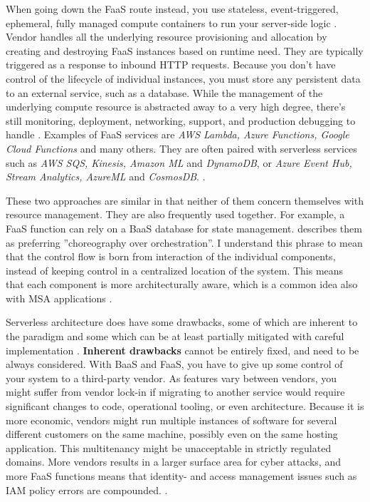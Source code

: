 \documentclass[utf8,english]{gradu3}
\begin{document}
When going down the FaaS route instead, you use stateless, event-triggered,
ephemeral, fully managed compute containers to run your server-side logic
\parencite{Roberts2018}. Vendor handles all the underlying resource provisioning
and allocation by creating and destroying FaaS instances based on runtime need.
They are typically triggered as a response to inbound HTTP requests. Because you
don't have control of the lifecycle of individual instances, you must store any
persistent data to an external service, such as a database. While the management
of the underlying compute resource is abstracted away to a very high degree,
there's still monitoring, deployment, networking, support, and production
debugging to handle \parencite{Roberts2018}. Examples of FaaS services are
\textit{AWS Lambda, Azure Functions, Google Cloud Functions} and many others.
They are often paired with serverless services such as \textit{AWS SQS, Kinesis,
Amazon ML} and \textit{DynamoDB}, or \textit{Azure Event Hub, Stream Analytics,
AzureML} and \textit{CosmosDB}.  \parencite[17]{Gannon2017}.

These two approaches are similar in that neither of them concern themselves with
resource management. They are also frequently used together. For example, a FaaS
function can rely on a BaaS database for state management.
\textcite{Roberts2018} describes them as preferring ''choreography over
orchestration''. I understand this phrase to mean that the control flow is born
from interaction of the individual components, instead of keeping control in a
centralized location of the system.  This means that each component is more
architecturally aware, which is a common idea also with MSA applications
\parencite{Roberts2018}.

Serverless architecture does have some drawbacks, some of which are inherent to
the paradigm and some which can be at least partially mitigated with careful
implementation \parencite{Roberts2018}. \textbf{Inherent drawbacks} cannot be
entirely fixed, and need to be always considered. With BaaS and FaaS, you have
to give up some control of your system to a third-party vendor. As features vary
between vendors, you might suffer from vendor lock-in if migrating to another
service would require significant changes to code, operational tooling, or even
architecture. Because it is more economic, vendors might run multiple instances
of software for several different customers on the same machine, possibly even
on the same hosting application. This multitenancy might be unacceptable in
strictly regulated domains. More vendors results in a larger surface area for
cyber attacks, and more FaaS functions means that identity- and access
management issues such as IAM policy errors are compounded.
\parencite{Roberts2018}.
\end{document}
